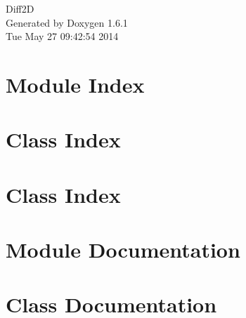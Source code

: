 \documentclass[a4paper]{book}
\begin{document}
\hypersetup{pageanchor=false}
\begin{titlepage}
\vspace*{7cm}
\begin{center}
{\Large Diff2D }\\
\vspace*{1cm}
{\large Generated by Doxygen 1.6.1}\\
\vspace*{0.5cm}
{\small Tue May 27 09:42:54 2014}\\
\end{center}
\end{titlepage}
\clearemptydoublepage
{}
\tableofcontents
\clearemptydoublepage
{}
\hypersetup{pageanchor=true}
\chapter{Module Index}

\chapter{Class Index}

\chapter{Class Index}

\chapter{Module Documentation}

\chapter{Class Documentation}


















\printindex
\end{document}
